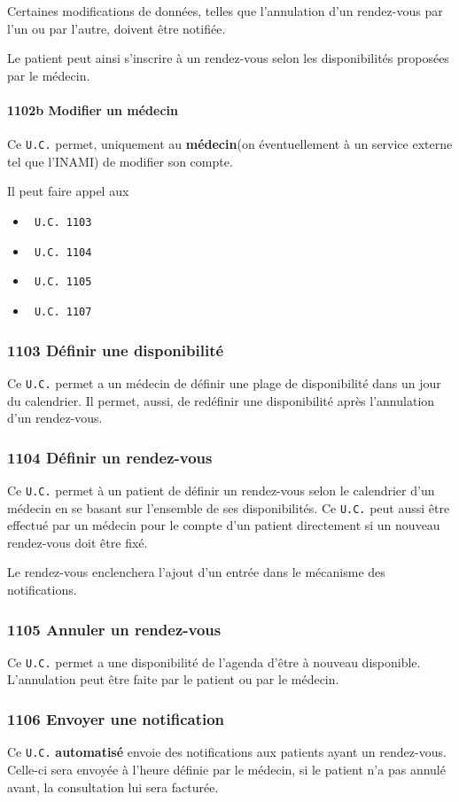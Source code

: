 \documentclass[a4paper, 11pt]{report}
\begin{document}
Certaines modifications de données, telles que l'annulation d'un rendez-vous par
l'un ou par l'autre, doivent être notifiée.

Le patient peut ainsi s'inscrire à un rendez-vous selon les disponibilités
proposées par le médecin.
\paragraph{1102b Modifier un médecin}
Ce \texttt{U.C.} permet, uniquement au \textbf{médecin}(on éventuellement à un
service externe tel que l'INAMI) de modifier son compte.

Il peut faire appel aux 
\begin{itemize}
	\item \texttt{~U.C. 1103} 
	\item \texttt{~U.C. 1104} 
	\item \texttt{~U.C. 1105}
	\item \texttt{~U.C. 1107}
\end{itemize}

\subsubsection{\label{1103}1103 Définir une disponibilité}
Ce \texttt{U.C.} permet a un médecin de définir une plage de disponibilité dans
un jour du calendrier. Il permet, aussi, de redéfinir une disponibilité après
l'annulation d'un rendez-vous.
\subsubsection{\label{1104}1104 Définir un rendez-vous}
Ce \texttt{U.C.} permet à un patient de définir un rendez-vous selon le
calendrier d'un médecin en se basant sur l'ensemble de ses disponibilités. 
Ce \texttt{U.C.} peut aussi être effectué par un médecin pour le compte d'un
patient directement si un nouveau rendez-vous doit être fixé.

Le rendez-vous enclenchera l'ajout d'un entrée dans le mécanisme des
notifications.
\subsubsection{\label{1105}1105 Annuler un rendez-vous}
Ce \texttt{U.C.} permet a une disponibilité de l'agenda d'être à nouveau
disponible. L'annulation peut être faite par le patient ou par le médecin. 
\subsubsection{\label{1106}1106 Envoyer une notification}
Ce \texttt{U.C.} \textbf{automatisé} envoie des notifications aux patients ayant
un rendez-vous. Celle-ci sera envoyée à l'heure définie par le médecin, si le
patient n'a pas annulé avant, la consultation lui sera facturée.
\end{document}
